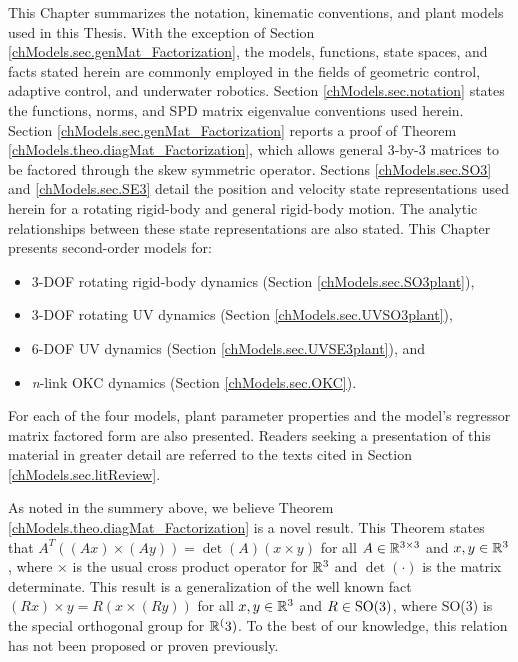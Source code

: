 
This Chapter summarizes the notation, kinematic conventions, and plant
models used in this Thesis.
%
With the exception of Section \ref{chModels.sec.genMat_Factorization},
the models, functions, state spaces, and facts stated herein are commonly
employed in the fields of geometric control,
adaptive control, and  underwater robotics. 
%
Section \ref{chModels.sec.notation} states the functions, norms, and
\ac{SPD} matrix eigenvalue conventions used herein.
%
Section \ref{chModels.sec.genMat_Factorization} reports a proof of
Theorem \ref{chModels.theo.diagMat_Factorization}, which allows
general 3-by-3 matrices to be factored through the skew symmetric
operator.
%
Sections \ref{chModels.sec.SO3} and \ref{chModels.sec.SE3} detail
the position and velocity state representations used herein for a
rotating rigid-body and general rigid-body motion.
%
The analytic relationships between these state representations are
also stated.
%
This Chapter presents second-order models for:
\begin{itemize}
\item 3-\ac{DOF} rotating rigid-body dynamics (Section \ref{chModels.sec.SO3plant}), 
\item 3-\ac{DOF} rotating \ac{UV} dynamics  (Section \ref{chModels.sec.UVSO3plant}), 
\item 6-\ac{DOF} \ac{UV} dynamics (Section \ref{chModels.sec.UVSE3plant}), and 
\item {\it n}-link \ac{OKC} dynamics (Section \ref{chModels.sec.OKC}).
\end{itemize}
%
For each of the four models, plant parameter properties and the
model's regressor matrix factored form are also presented.
%
Readers seeking a presentation of this material in greater detail are
referred to the texts cited in Section \ref{chModels.sec.litReview}.


As noted in the summery above, we believe Theorem
\ref{chModels.theo.diagMat_Factorization} is a novel result.
%
This Theorem states that $A^T((Ax)\times(Ay))=\det(A)(x\times y)$ for
all $A\in\mathbb{R}^{3\times 3}$ and $x,y\in\mathbb{R}^{3}$, where $\times$ is the
usual cross product operator for $\mathbb{R}^{3}$ and $\det(\cdot)$ is the
matrix determinate.
%
This result is a generalization of the well known fact $(Rx)\times y=
R(x\times(Ry))$ for all $x,y\in\mathbb{R}^{3}$ and $R\in\SO3$, where SO(3) is
the special orthogonal group for $\mathbb{R}^{(}3)$.
%
To the best of our knowledge, this relation has not been proposed or
proven previously.



